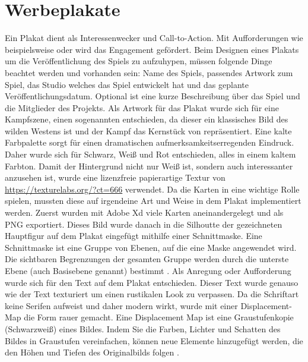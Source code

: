 
\section{Werbeplakate}\label{sec:trailer}

\renewcommand{\kapitelautor}{Autor: Markus Böheim}

Ein Plakat dient als Interessenwecker und Call-to-Action. Mit Aufforderungen wie beispielsweise
 oder  wird das Engagement gefördert.
Beim Designen eines Plakats um die Veröffentlichung des Spiels zu aufzuhypen, müssen folgende Dinge beachtet werden und vorhanden sein: Name des Spiels, passendes Artwork zum Spiel, das Studio welches das Spiel entwickelt hat und das geplante Veröffentlichungsdatum. Optional ist eine kurze Beschreibung über das Spiel und die Mitglieder des Projekts.
Als Artwork für das Plakat wurde sich für eine Kampfszene, einen sogenannten  entschieden, da dieser
ein klassisches Bild des wilden Westens ist und der Kampf das Kernstück von \FF repräsentiert. Eine kalte Farbpalette
sorgt für einen dramatischen aufmerksamkeitserregenden Eindruck. Daher wurde sich für Schwarz, Weiß und Rot
entschieden, alles in einem kaltem Farbton. Damit der Hintergrund nicht nur Weiß ist, sondern auch interessanter
anzusehen ist, wurde eine lizenzfreie papierartige Textur von \url{https://texturelabs.org/?ct=666} verwendet. Da die
Karten in \FF eine wichtige Rolle spielen, mussten diese auf irgendeine Art und Weise in dem Plakat implementiert
werden. Zuerst wurden mit Adobe Xd viele Karten aneinandergelegt und als PNG exportiert. Dieses Bild wurde danach in
die Silhoutte der gezeichneten Hauptfigur auf dem Plakat eingefügt mithilfe einer Schnittmaske. Eine Schnittmaske ist
eine Gruppe von Ebenen, auf die eine Maske angewendet wird. Die sichtbaren Begrenzungen der gesamten Gruppe werden
durch die unterste Ebene (auch Basisebene genannt) bestimmt . Als Anregung oder Aufforderung wurde
sich für den Text
 auf dem Plakat entschieden. Dieser Text wurde genauso wie der Text
 texturiert um einen rustikalen Look zu verpassen. Da die Schriftart keine Serifen aufweist und
daher modern wirkt, wurde mit einer Displacement-Map die Form rauer gemacht. Eine Displacement Map ist eine
Graustufenkopie (Schwarzweiß) eines Bildes. Indem Sie die Farben, Lichter und Schatten des Bildes in Graustufen
vereinfachen, können neue Elemente hinzugefügt werden, die den Höhen und Tiefen des Originalbilds folgen .
